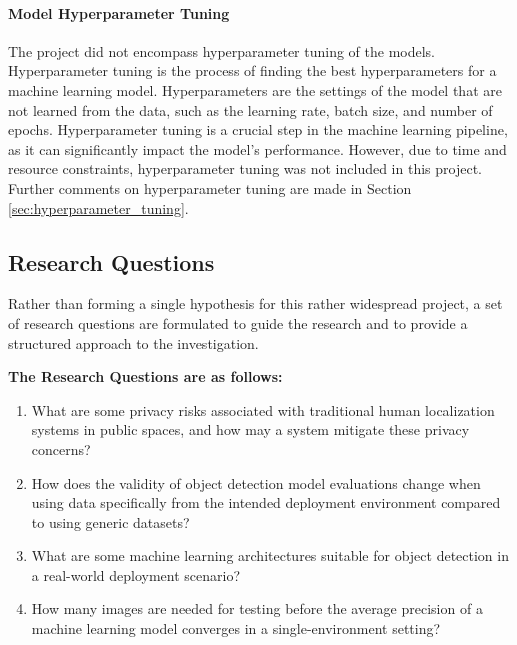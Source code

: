 \paragraph{Model Hyperparameter Tuning}
\label{sec:scope_hyperparameter_tuning}
The project did not encompass hyperparameter tuning of the models. Hyperparameter tuning is the process of finding the best hyperparameters for a machine learning model. Hyperparameters are the settings of the model that are not learned from the data, such as the learning rate, batch size, and number of epochs. Hyperparameter tuning is a crucial step in the machine learning pipeline, as it can significantly impact the model's performance. However, due to time and resource constraints, hyperparameter tuning was not included in this project. Further comments on hyperparameter tuning are made in Section \ref{sec:hyperparameter_tuning}.

\subsection{Research Questions}
\label{sec:research_questions}
Rather than forming a single hypothesis for this rather widespread project, a set of research questions are formulated to guide the research and to provide a structured approach to the investigation.


\textbf{The Research Questions are as follows:}
\begin{enumerate}
	\item What are some privacy risks associated with traditional human localization systems in public spaces, and how may a system mitigate these privacy concerns?
	\item How does the validity of object detection model evaluations change when using data specifically from the intended deployment environment compared to using generic datasets?
	\item What are some machine learning architectures suitable for object detection in a real-world deployment scenario?
	\item How many images are needed for testing before the average precision of a machine learning model converges in a single-environment setting?
\end{enumerate}

